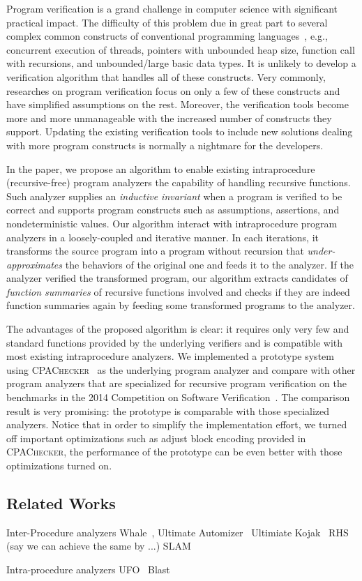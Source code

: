 Program verification is a grand challenge in computer science with significant practical impact. 
The difficulty of this problem due in great part to several complex common constructs of conventional programming languages~\cite{ClarkeJS05}, e.g., concurrent execution of threads, pointers with unbounded heap size, function call with recursions, and unbounded/large basic data types. It is unlikely to develop a verification algorithm that handles all of these constructs. Very commonly, researches on program verification focus on only a few of these constructs and have simplified assumptions on the rest. Moreover, the verification tools become more and more unmanageable with the increased number of constructs they support. Updating the existing verification tools to include new solutions dealing with more program constructs is normally a nightmare for the developers.

In the paper, we propose an algorithm to enable existing intraprocedure (recursive-free) program analyzers the capability of handling recursive functions. 
Such analyzer supplies an \emph{inductive invariant} when a program is verified to be correct and supports program constructs such as assumptions, assertions, and nondeterministic values. Our algorithm interact with intraprocedure program analyzers in a loosely-coupled and iterative manner. 
In each iterations, it transforms the source program into a program without recursion that \emph{under-approximates} the behaviors of the original one and feeds it to the analyzer.
If the analyzer verified the transformed program, our algorithm extracts candidates of \emph{function summaries} of recursive functions involved and checks if they are indeed function summaries again by feeding some transformed programs to the analyzer. 

The advantages of the proposed algorithm is clear: it requires only very few and standard functions provided by the underlying verifiers and is compatible with most existing intraprocedure analyzers. We implemented a prototype system using \textsc{CPAChecker}~\cite{BeyerK11} as the underlying program analyzer and compare
with other program analyzers that are specialized for recursive program verification on the benchmarks in the 2014 Competition on Software Verification~\cite{svcomp14}.
The comparison result is very promising: the prototype is comparable with those specialized analyzers. Notice that in order to simplify the implementation effort, we turned off important optimizations such as adjust block encoding provided in \textsc{CPAChecker}, the performance of the prototype can be even better with those optimizations turned on. 

\subsection*{Related Works}
Inter-Procedure analyzers
Whale~\cite{AlbarghouthiGC12},
Ultimate Automizer~\cite{HeizmannCDEHLNSP13}
Ultimiate Kojak~\cite{Kojak}
RHS~\cite{RepsHS95} (say we can achieve the same by ...)
SLAM~\cite{BallR01}

Intra-procedure analyzers
UFO~\cite{AlbarghouthiLGC12}
Blast~\cite{BeyerHJM07}



